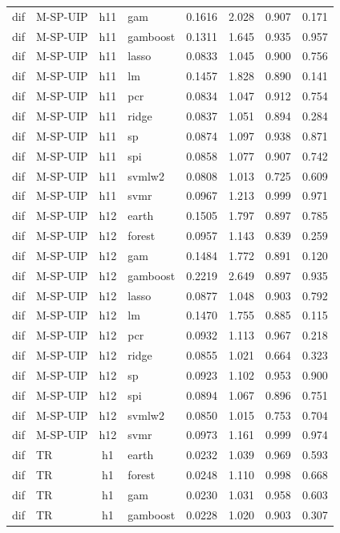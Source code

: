 \begin{ThreePartTable}
\begin{longtable}[t]{llclcccc}
dif & M-SP-UIP & h11 & gam & 0.1616 & 2.028 & 0.907 & 0.171\\
dif & M-SP-UIP & h11 & gamboost & 0.1311 & 1.645 & 0.935 & 0.957\\
dif & M-SP-UIP & h11 & lasso & 0.0833 & 1.045 & 0.900 & 0.756\\
dif & M-SP-UIP & h11 & lm & 0.1457 & 1.828 & 0.890 & 0.141\\
dif & M-SP-UIP & h11 & pcr & 0.0834 & 1.047 & 0.912 & 0.754\\
dif & M-SP-UIP & h11 & ridge & 0.0837 & 1.051 & 0.894 & 0.284\\
dif & M-SP-UIP & h11 & sp & 0.0874 & 1.097 & 0.938 & 0.871\\
dif & M-SP-UIP & h11 & spi & 0.0858 & 1.077 & 0.907 & 0.742\\
dif & M-SP-UIP & h11 & svmlw2 & 0.0808 & 1.013 & 0.725 & 0.609\\
dif & M-SP-UIP & h11 & svmr & 0.0967 & 1.213 & 0.999 & 0.971\\
\addlinespace
dif & M-SP-UIP & h12 & earth & 0.1505 & 1.797 & 0.897 & 0.785\\
dif & M-SP-UIP & h12 & forest & 0.0957 & 1.143 & 0.839 & 0.259\\
dif & M-SP-UIP & h12 & gam & 0.1484 & 1.772 & 0.891 & 0.120\\
dif & M-SP-UIP & h12 & gamboost & 0.2219 & 2.649 & 0.897 & 0.935\\
dif & M-SP-UIP & h12 & lasso & 0.0877 & 1.048 & 0.903 & 0.792\\
dif & M-SP-UIP & h12 & lm & 0.1470 & 1.755 & 0.885 & 0.115\\
dif & M-SP-UIP & h12 & pcr & 0.0932 & 1.113 & 0.967 & 0.218\\
dif & M-SP-UIP & h12 & ridge & 0.0855 & 1.021 & 0.664 & 0.323\\
dif & M-SP-UIP & h12 & sp & 0.0923 & 1.102 & 0.953 & 0.900\\
dif & M-SP-UIP & h12 & spi & 0.0894 & 1.067 & 0.896 & 0.751\\
dif & M-SP-UIP & h12 & svmlw2 & 0.0850 & 1.015 & 0.753 & 0.704\\
dif & M-SP-UIP & h12 & svmr & 0.0973 & 1.161 & 0.999 & 0.974\\
\addlinespace
dif & TR & h1 & earth & 0.0232 & 1.039 & 0.969 & 0.593\\
dif & TR & h1 & forest & 0.0248 & 1.110 & 0.998 & 0.668\\
dif & TR & h1 & gam & 0.0230 & 1.031 & 0.958 & 0.603\\
dif & TR & h1 & gamboost & 0.0228 & 1.020 & 0.903 & 0.307\\

\end{longtable}
\end{ThreePartTable}
